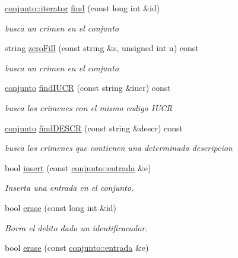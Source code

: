 \begin{DoxyCompactItemize}
\item 
\hyperlink{classconjunto_1_1iterator}{conjunto\-::iterator} \hyperlink{classconjunto_a64d02e56b460a58d596f986c055f0a2e}{find} (const long int \&id)
\begin{DoxyCompactList}\small\item\em busca un crimen en el conjunto \end{DoxyCompactList}\item 
string \hyperlink{classconjunto_a9060b8225a7337858b66916f0a155a4b}{zero\-Fill} (const string \&s, unsigned int n) const 
\begin{DoxyCompactList}\small\item\em busca un crimen en el conjunto \end{DoxyCompactList}\item 
\hyperlink{classconjunto}{conjunto} \hyperlink{classconjunto_a2ca2a7b59bce8369e9d9ccc1c7be9614}{find\-I\-U\-C\-R} (const string \&iucr) const 
\begin{DoxyCompactList}\small\item\em busca los crimenes con el mismo codigo I\-U\-C\-R \end{DoxyCompactList}\item 
\hyperlink{classconjunto}{conjunto} \hyperlink{classconjunto_afff3e7f4b3d00f422dd7ab2fec935378}{find\-D\-E\-S\-C\-R} (const string \&descr) const 
\begin{DoxyCompactList}\small\item\em busca los crimenes que contienen una determinada descripcion \end{DoxyCompactList}\item 
bool \hyperlink{classconjunto_aa65b9f7c4cb9bad6d4e40c1973095930}{insert} (const \hyperlink{classconjunto_a09cad766dd65de73e51eae21f9d22585}{conjunto\-::entrada} \&e)
\begin{DoxyCompactList}\small\item\em Inserta una entrada en el conjunto. \end{DoxyCompactList}\item 
bool \hyperlink{classconjunto_ad550177fa4454da3a10fa356417e39a7}{erase} (const long int \&id)
\begin{DoxyCompactList}\small\item\em Borra el delito dado un identificacador. \end{DoxyCompactList}\item 
bool \hyperlink{classconjunto_a77a21ed91f1002f4eaed48d86535a874}{erase} (const \hyperlink{classconjunto_a09cad766dd65de73e51eae21f9d22585}{conjunto\-::entrada} \&e)

\end{DoxyCompactItemize}
